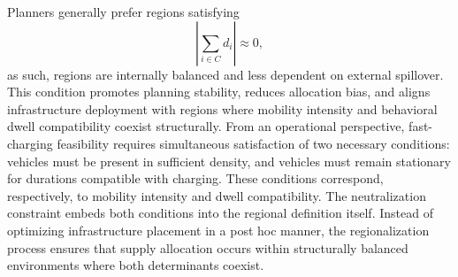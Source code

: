 \documentclass[conference]{IEEEtran}
\begin{document}
Planners generally prefer regions satisfying
\begin{equation}
\left|\sum_{i\in C} d_i\right| \approx 0,
\end{equation}
as such, regions are internally balanced and less dependent on external spillover. This condition promotes planning stability, reduces
allocation bias, and aligns infrastructure deployment with regions where mobility intensity and behavioral dwell compatibility
coexist structurally.
From an operational perspective, fast-charging feasibility requires simultaneous satisfaction of two necessary conditions: vehicles must
be present in sufficient density, and vehicles must remain stationary for durations compatible with charging. These conditions correspond, respectively, to mobility intensity and dwell compatibility. The neutralization constraint embeds both conditions into the regional
definition itself. Instead of optimizing infrastructure placement in
a post hoc manner, the regionalization process ensures that supply allocation occurs within structurally balanced environments where both determinants coexist.


\end{document}

